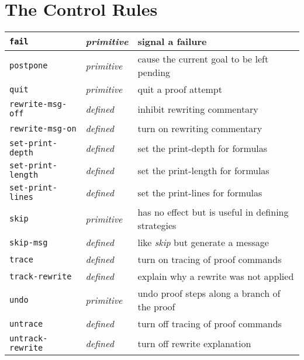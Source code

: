 \documentclass[12pt,twoside]{book}
\makeatletter
\newcommand{\indtt}[1]{\texttt{#1}\index{#1@{\texttt{#1}}}}  %
\makeatother
\begin{document}
\section{The Control Rules}
\begin{tabularx}{\textwidth}{|l|l|X|}\hline
\indtt{fail} & \emph{primitive} & signal a failure\\\hline
\indtt{postpone}& \emph{primitive} & cause the current goal to be
left pending\\\hline
\indtt{quit} & \emph{primitive} & quit a proof attempt \\\hline
\indtt{rewrite-msg-off} & \emph{defined} & inhibit rewriting
commentary\\\hline
\indtt{rewrite-msg-on} & \emph{defined} & turn on rewriting
commentary\\\hline
\indtt{set-print-depth} & \emph{defined} & set the print-depth for formulas \\\hline
\indtt{set-print-length} & \emph{defined} & set the print-length for formulas \\\hline
\indtt{set-print-lines} & \emph{defined} & set the print-lines for formulas \\\hline
\indtt{skip} & \emph{primitive} & has no effect but is useful in defining
strategies\\\hline
\indtt{skip-msg} & \emph{defined} & like \emph{skip} but generate a
message\\\hline
\indtt{trace} & \emph{defined} & turn on tracing of proof
commands\\\hline
\indtt{track-rewrite} & \emph{defined} & explain why a rewrite was not
applied\\\hline
\indtt{undo} & \emph{primitive} & undo proof steps along a branch of
the proof\\\hline
\indtt{untrace} & \emph{defined} & turn off tracing of proof commands\\\hline
\indtt{untrack-rewrite} & \emph{defined} & turn off rewrite explanation\\\hline
\end{tabularx}
\end{document}
